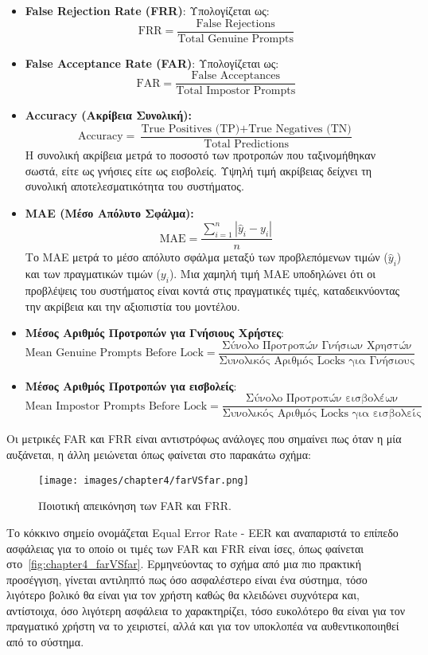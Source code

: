 \begin{itemize}
    \item \textbf{False Rejection Rate (FRR)}: Υπολογίζεται ως:
    \[
    \text{FRR} = \frac{\text{False Rejections}}{\text{Total Genuine Prompts}}
    \]
    \item \textbf{False Acceptance Rate (FAR)}: Υπολογίζεται ως:
    \[
    \text{FAR} = \frac{\text{False Acceptances}}{\text{Total Impostor Prompts}}
    \]
    \item \textbf{Accuracy (Ακρίβεια Συνολική):}
    \[\text{Accuracy} = \frac{\text{True Positives (TP)} + \text{True Negatives (TN)}}{\text{Total Predictions}}\]
    Η συνολική ακρίβεια μετρά το ποσοστό των προτροπών που ταξινομήθηκαν σωστά, είτε ως γνήσιες είτε ως εισβολείς. Υψηλή τιμή ακρίβειας δείχνει τη συνολική αποτελεσματικότητα του συστήματος.

    \item \textbf{MAE (Μέσο Απόλυτο Σφάλμα):}
    \[\text{MAE} = \frac{\sum_{i=1}^{n} |\hat{y}_i - y_i|}{n}\]
    Το MAE μετρά το μέσο απόλυτο σφάλμα μεταξύ των προβλεπόμενων τιμών (\(\hat{y}_i\)) και των πραγματικών τιμών (\(y_i\)). Μια χαμηλή τιμή MAE υποδηλώνει ότι οι προβλέψεις του συστήματος είναι κοντά στις πραγματικές τιμές, καταδεικνύοντας την ακρίβεια και την αξιοπιστία του μοντέλου.
    
    \item \textbf{Μέσος Αριθμός Προτροπών για Γνήσιους Χρήστες}:
    \[
    \text{Mean Genuine Prompts Before Lock} = \frac{\text{Σύνολο Προτροπών Γνήσιων Χρηστών}}{\text{Συνολικός Αριθμός Locks για Γνήσιους}}
    \]
    \item \textbf{Μέσος Αριθμός Προτροπών για εισβολείς}:
    \[
    \text{Mean Impostor Prompts Before Lock} = \frac{\text{Σύνολο Προτροπών εισβολέων}}{\text{Συνολικός Αριθμός Locks για εισβολείς}}
    \]

\end{itemize}

Οι μετρικές FAR και FRR είναι αντιστρόφως ανάλογες που σημαίνει πως όταν η μία αυξάνεται, η άλλη μειώνεται όπως φαίνεται στο παρακάτω σχήμα:
\begin{figure}[H]
    \centering
    \texttt{[image: images/chapter4/farVSfar.png]}
    \caption{Ποιοτική απεικόνηση των FAR και FRR.}
    \label{fig:chapter4_farVSfar}
\end{figure}
Το κόκκινο σημείο ονομάζεται Equal Error Rate - EER και αναπαριστά το επίπεδο ασφάλειας για το οποίο οι τιμές των FAR και FRR είναι ίσες, όπως φαίνεται στο~\autoref{fig:chapter4_farVSfar}. Ερμηνεύοντας το σχήμα από μια πιο πρακτική προσέγγιση, γίνεται αντιληπτό πως όσο ασφαλέστερο είναι ένα σύστημα, τόσο λιγότερο βολικό θα είναι για τον χρήστη καθώς θα κλειδώνει συχνότερα και, αντίστοιχα, όσο λιγότερη ασφάλεια το χαρακτηρίζει, τόσο ευκολότερο θα είναι για τον πραγματικό χρήστη να το χειριστεί, αλλά και για τον υποκλοπέα να αυθεντικοποιηθεί από το σύστημα.


